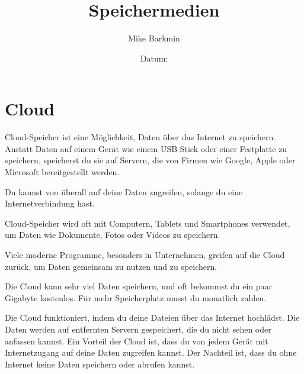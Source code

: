 \documentclass[a4paper,14pt]{scrartcl}
\title{Speichermedien}
\author{Mike Barkmin}
\date{Datum: \hspace{1.5cm}}
\begin{document}
\section*{ Cloud}

Cloud-Speicher ist eine Möglichkeit, Daten über das Internet zu speichern. Anstatt Daten auf einem Gerät wie einem USB-Stick oder einer Festplatte zu speichern, speicherst du sie auf Servern, die von Firmen wie Google, Apple oder Microsoft bereitgestellt werden. 

Du kannst von überall auf deine Daten zugreifen, solange du eine Internetverbindung hast. 

Cloud-Speicher wird oft mit Computern, Tablets und Smartphones verwendet, um Daten wie Dokumente, Fotos oder Videos zu speichern. 

Viele moderne Programme, besonders in Unternehmen, greifen auf die Cloud zurück, um Daten gemeinsam zu nutzen und zu speichern. 

Die Cloud kann sehr viel Daten speichern, und oft bekommst du ein paar Gigabyte kostenlos. Für mehr Speicherplatz musst du monatlich zahlen.

Die Cloud funktioniert, indem du deine Dateien über das Internet hochlädst. Die Daten werden auf entfernten Servern gespeichert, die du nicht sehen oder anfassen kannst. Ein Vorteil der Cloud ist, dass du von jedem Gerät mit Internetzugang auf deine Daten zugreifen kannst. Der Nachteil ist, dass du ohne Internet keine Daten speichern oder abrufen kannst.
\end{document}
